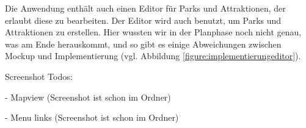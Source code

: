 Die Anwendung enthält auch einen Editor für Parks und Attraktionen, der erlaubt diese zu 
bearbeiten. Der Editor wird auch benutzt, um Parks und Attraktionen zu erstellen. Hier wussten wir 
in der Planphase noch nicht genau, was am Ende herauskommt, und so gibt es einige Abweichungen 
zwischen Mockup und Implementierung (vgl. Abbildung \ref{figure:implementierungeditor}).

Screenshot Todos:

- Mapview (Screenshot ist schon im Ordner)

- Menu links (Screenshot ist schon im Ordner)




















